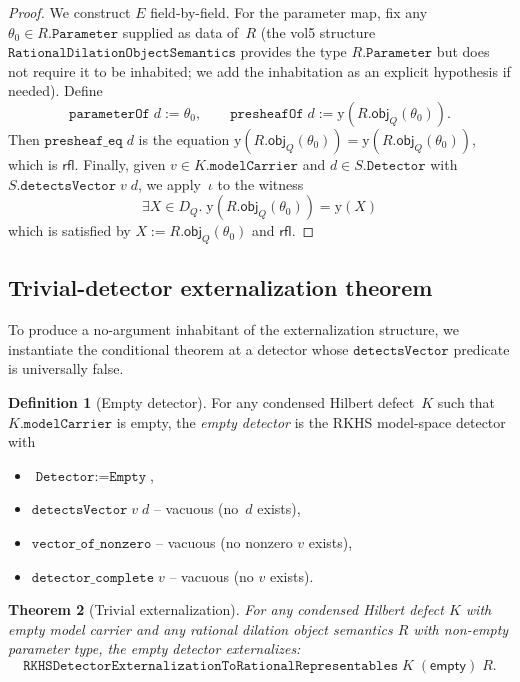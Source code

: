 \documentclass[12pt]{article}
\theoremstyle{plain}
\newtheorem{theorem}{Theorem}[section]
\theoremstyle{definition}
\newtheorem{definition}[theorem]{Definition}
\theoremstyle{remark}
\newcommand{\Yon}{\mathrm{y}}
\newcommand{\DQ}{D_{Q}}
\newcommand{\objQ}{\mathsf{obj}_{Q}}
\begin{document}
\begin{proof}
We construct $E$ field-by-field.  For the parameter map, fix any
$\theta_0\in R.\texttt{Parameter}$ supplied as data of~$R$ (the vol5
structure $\texttt{RationalDilationObjectSemantics}$ provides the type
$R.\texttt{Parameter}$ but does not require it to be inhabited; we add
the inhabitation as an explicit hypothesis if needed).  Define
\[
  \texttt{parameterOf}\;d := \theta_0,\qquad
  \texttt{presheafOf}\;d := \Yon(R.\objQ(\theta_0)).
\]
Then $\texttt{presheaf\_eq}\;d$ is the equation
$\Yon(R.\objQ(\theta_0)) = \Yon(R.\objQ(\theta_0))$, which is
$\mathsf{rfl}$.  Finally, given $v\in K.\texttt{modelCarrier}$ and
$d\in S.\texttt{Detector}$ with $S.\texttt{detectsVector}\;v\;d$, we
apply~$\iota$ to the witness
\[
  \exists X\in\DQ.\;\Yon(R.\objQ(\theta_0)) = \Yon(X)
\]
which is satisfied by $X := R.\objQ(\theta_0)$ and
$\mathsf{rfl}$.
\end{proof}

\subsection{Trivial-detector externalization theorem}

To produce a no-argument inhabitant of the externalization structure,
we instantiate the conditional theorem at a detector whose
$\texttt{detectsVector}$ predicate is universally false.

\begin{definition}[Empty detector]
\label{def:empty-detector}
For any condensed Hilbert defect~$K$ such that
$K.\texttt{modelCarrier}$ is empty, the \emph{empty detector} is the
RKHS model-space detector with
\begin{itemize}
  \item $\texttt{Detector} := \texttt{Empty}$,
  \item $\texttt{detectsVector}\;v\;d$ -- vacuous (no~$d$ exists),
  \item $\texttt{vector\_of\_nonzero}$ -- vacuous (no nonzero
    $v$ exists),
  \item $\texttt{detector\_complete}\;v$ -- vacuous (no $v$ exists).
\end{itemize}
\end{definition}

\begin{theorem}[Trivial externalization]
\label{thm:trivial-ext}
For any condensed Hilbert defect $K$ with empty model carrier and any
rational dilation object semantics $R$ with non-empty parameter type,
the empty detector externalizes:
\[
  \texttt{RKHSDetectorExternalizationToRationalRepresentables}\;K\;
  (\textsf{empty})\;R.
\]
\end{theorem}
\end{document}
